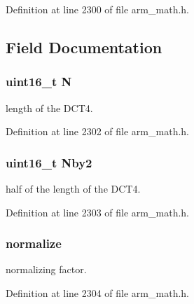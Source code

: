 Definition at line 2300 of file arm\+\_\+math.\+h.



\subsection{Field Documentation}
\subsubsection[{\texorpdfstring{N}{N}}]{\setlength{\rightskip}{0pt plus 5cm}uint16\+\_\+t N}\hypertarget{structarm__dct4__instance__q31_a37d49571fe35012087153c093705cd11}{}\label{structarm__dct4__instance__q31_a37d49571fe35012087153c093705cd11}
length of the D\+C\+T4. 

Definition at line 2302 of file arm\+\_\+math.\+h.

\subsubsection[{\texorpdfstring{Nby2}{Nby2}}]{\setlength{\rightskip}{0pt plus 5cm}uint16\+\_\+t Nby2}\hypertarget{structarm__dct4__instance__q31_afa64b1618089e35c2b55cff71cb29715}{}\label{structarm__dct4__instance__q31_afa64b1618089e35c2b55cff71cb29715}
half of the length of the D\+C\+T4. 

Definition at line 2303 of file arm\+\_\+math.\+h.

\subsubsection[{\texorpdfstring{normalize}{normalize}}]{ normalize}\hypertarget{structarm__dct4__instance__q31_a3a2f571658a202a38fa508098001b47c}{}\label{structarm__dct4__instance__q31_a3a2f571658a202a38fa508098001b47c}
normalizing factor. 

Definition at line 2304 of file arm\+\_\+math.\+h.

